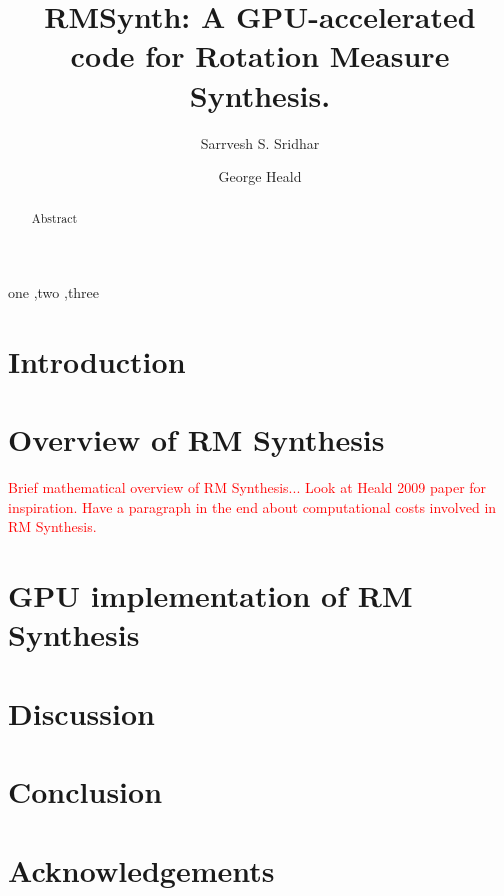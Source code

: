 \documentclass[final,authoryear,3p,times]{elsarticle}
\begin{document}
\begin{frontmatter}

\title{RMSynth: A GPU-accelerated code for Rotation Measure Synthesis.}

\author[kap, ast]{Sarrvesh S. Sridhar}
\author[csi, kap]{George Heald}

\address[kap]{Kapteyn Astronomical Institute, University of Groningen, Postbus 800, 9700AV Groningen, The Netherlands.}
\address[ast]{ASTRON, the Netherlands Institute for Radio Astronomy, Postbus 2, 7990 AA, Dwingeloo, The Netherlands.}
\address[csi]{csiro}

\begin{abstract}
Abstract
\end{abstract}

\begin{keyword}
one \sep  two  \sep three
\end{keyword}

\end{frontmatter}

\section{Introduction}

\section{Overview of RM Synthesis}
\textcolor{red}{Brief mathematical overview of RM Synthesis... Look at Heald 2009 paper for inspiration.}
\textcolor{red}{Have a paragraph in the end about computational costs involved in RM Synthesis.}

\section{GPU implementation of RM Synthesis}

\section{Discussion}

\section{Conclusion}

\section*{Acknowledgements}



\end{document}
